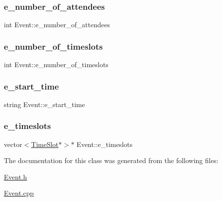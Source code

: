 \subsubsection{\texorpdfstring{e\+\_\+number\+\_\+of\+\_\+attendees}{e\_number\_of\_attendees}}
{\footnotesize\ttfamily int Event\+::e\+\_\+number\+\_\+of\+\_\+attendees\hspace{0.3cm}{\ttfamily [private]}}

\mbox{\label{class_event_a6784c7edd91dc873c16b420c00799f0b}} 
\subsubsection{\texorpdfstring{e\+\_\+number\+\_\+of\+\_\+timeslots}{e\_number\_of\_timeslots}}
{\footnotesize\ttfamily int Event\+::e\+\_\+number\+\_\+of\+\_\+timeslots\hspace{0.3cm}{\ttfamily [private]}}

\mbox{\label{class_event_a95f673d61a2a65a3a596cac4fbeb1f83}} 
\subsubsection{\texorpdfstring{e\+\_\+start\+\_\+time}{e\_start\_time}}
{\footnotesize\ttfamily string Event\+::e\+\_\+start\+\_\+time\hspace{0.3cm}{\ttfamily [private]}}

\mbox{\label{class_event_a1d8d11d893c1149b3518aa332172b26e}} 
\subsubsection{\texorpdfstring{e\+\_\+timeslots}{e\_timeslots}}
{\footnotesize\ttfamily vector$<$\hyperlink{class_time_slot}{Time\+Slot}$\ast$$>$$\ast$ Event\+::e\+\_\+timeslots}



The documentation for this class was generated from the following files\+:\begin{DoxyCompactItemize}
\item 
\hyperlink{_event_8h}{Event.\+h}\item 
\hyperlink{_event_8cpp}{Event.\+cpp}\end{DoxyCompactItemize}
